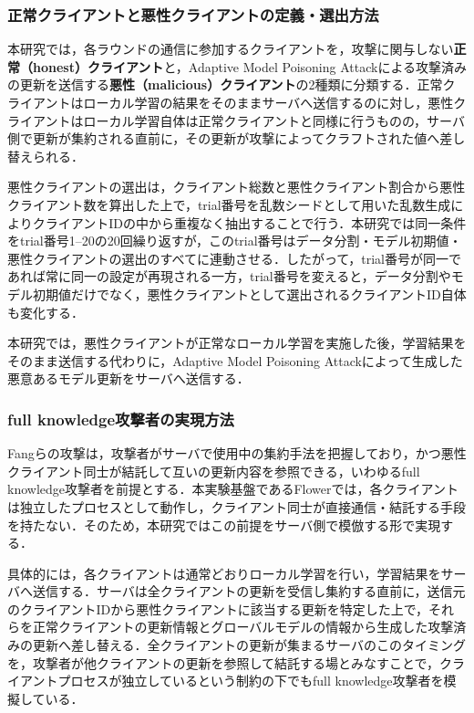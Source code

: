 \documentclass[a4j, twocolumn, dvipdfmx]{jsarticle}  %
\begin{document}
\subsubsection*{正常クライアントと悪性クライアントの定義・選出方法}

本研究では，各ラウンドの通信に参加するクライアントを，攻撃に関与しない\textbf{正常（honest）クライアント}と，Adaptive Model Poisoning Attackによる攻撃済みの更新を送信する\textbf{悪性（malicious）クライアント}の2種類に分類する．正常クライアントはローカル学習の結果をそのままサーバへ送信するのに対し，悪性クライアントはローカル学習自体は正常クライアントと同様に行うものの，サーバ側で更新が集約される直前に，その更新が攻撃によってクラフトされた値へ差し替えられる．

悪性クライアントの選出は，クライアント総数と悪性クライアント割合から悪性クライアント数を算出した上で，trial番号を乱数シードとして用いた乱数生成によりクライアントIDの中から重複なく抽出することで行う．本研究では同一条件をtrial番号1--20の20回繰り返すが，このtrial番号はデータ分割・モデル初期値・悪性クライアントの選出のすべてに連動させる．したがって，trial番号が同一であれば常に同一の設定が再現される一方，trial番号を変えると，データ分割やモデル初期値だけでなく，悪性クライアントとして選出されるクライアントID自体も変化する．

本研究では，悪性クライアントが正常なローカル学習を実施した後，学習結果をそのまま送信する代わりに，Adaptive Model Poisoning Attackによって生成した悪意あるモデル更新をサーバへ送信する．

\subsubsection*{full knowledge攻撃者の実現方法}

Fangらの攻撃は，攻撃者がサーバで使用中の集約手法を把握しており，かつ悪性クライアント同士が結託して互いの更新内容を参照できる，いわゆるfull knowledge攻撃者を前提とする．本実験基盤であるFlowerでは，各クライアントは独立したプロセスとして動作し，クライアント同士が直接通信・結託する手段を持たない．そのため，本研究ではこの前提をサーバ側で模倣する形で実現する．

具体的には，各クライアントは通常どおりローカル学習を行い，学習結果をサーバへ送信する．サーバは全クライアントの更新を受信し集約する直前に，送信元のクライアントIDから悪性クライアントに該当する更新を特定した上で，それらを正常クライアントの更新情報とグローバルモデルの情報から生成した攻撃済みの更新へ差し替える．全クライアントの更新が集まるサーバのこのタイミングを，攻撃者が他クライアントの更新を参照して結託する場とみなすことで，クライアントプロセスが独立しているという制約の下でもfull knowledge攻撃者を模擬している．
\end{document}
